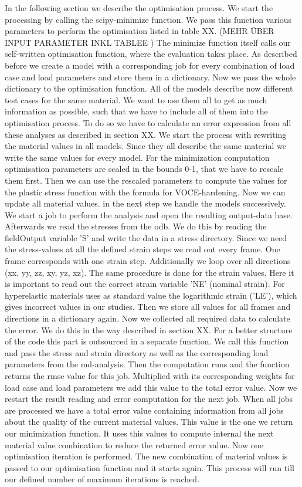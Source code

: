     In the following section we describe the optimisation process. We start the processing by calling the scipy-minimize function. We pass this function various parameters to perform the optimisation listed in table XX. (MEHR ÜBER INPUT PARAMETER INKL TABLEE ) The minimize function itself calls our self-written optimisation function, where the evaluation takes place. As described before we create a model with a corresponding job for every combination of load case and load parameters and store them in a dictionary. Now we pass the whole dictionary to the optimisation function. All of the models describe now different test cases for the same material. We want to use them all to get as much information as possible, such that we have to include all of them into the optimisation process. To do so we have to calculate an error expression from all these analyses as described in section XX. 
    We start the process with rewriting the material values in all models. Since they all describe the same material we write the same values for every model. For the minimization computation optimisation parameters are scaled in the bounds 0-1, that we have to rescale them first. Then we can use the rescaled parameters to compute the values for the plastic stress function with the formula for VOCE-hardening. Now we can update all material values. in the next step we handle the models successively. We start a job to perform the  analysis and open the resulting output-data base. Afterwards we read the stresses from the odb. We do this by reading the fieldOutput variable 'S' and write the data in a stress directory. Since we need the stress-values at all the defined strain steps we read out every frame. One frame corresponds with one strain step. Additionally we loop over all directions (xx, yy, zz, xy, yz, xz). The same procedure is done for the strain values. Here it is important to read out the correct strain variable 'NE' (nominal strain). For hyperelastic materials  uses as standard value the logarithmic strain ('LE'), which gives incorrect values in our studies. Then we store all values for all frames and directions in a dictionary again. Now we collected all required data to calculate the error. We do this in the way described in section XX. For a better structure of the code this part is outsourced in a separate function. We call this function and pass the stress and strain directory as well as the corresponding load parameters from the md-analysis. Then the computation runs and the function returns the rmse value for this job. Multiplied with its corresponding weights for load case and load parameters we add this value to the total error value. Now we restart the result reading and error computation for the next job. When all jobs are processed we have a total error value containing information from all jobs about the quality of the current material values. This value is the one we return our minimization function. It uses this values to compute internal the next material value combination to reduce the returned error value. Now one optimisation iteration is performed. The new combination of material values is passed to our optimisation function and it starts again. This process will run till our defined number of maximum iterations is reached. 

